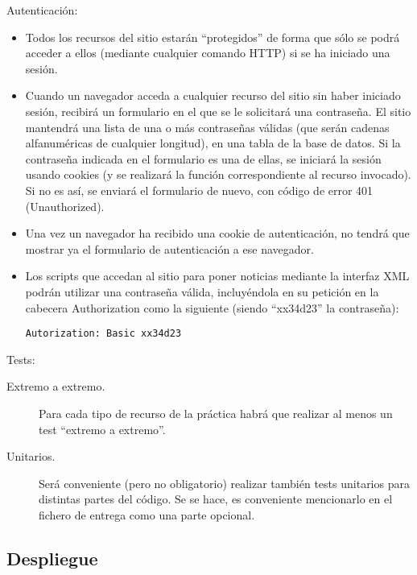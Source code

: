 Autenticación:

\begin{itemize}
\item Todos los recursos del sitio estarán ``protegidos'' de forma que sólo se podrá acceder a ellos (mediante cualquier comando HTTP) si se ha iniciado una sesión.
  
\item Cuando un navegador acceda a cualquier recurso del sitio sin haber iniciado sesión, recibirá un formulario en el que se le solicitará una contraseña. El sitio mantendrá una lista de una o más contraseñas válidas (que serán cadenas alfanuméricas de cualquier longitud), en una tabla de la base de datos. Si la contraseña indicada en el formulario es una de ellas, se iniciará la sesión usando cookies (y se realizará la función correspondiente al recurso invocado). Si no es así, se enviará el formulario de nuevo, con código de error 401 (Unauthorized).

\item Una vez un navegador ha recibido una cookie de autenticación, no tendrá que mostrar ya el formulario de autenticación a ese navegador.
  
\item Los scripts que accedan al sitio para poner noticias mediante la interfaz XML podrán utilizar una contraseña válida, incluyéndola en su petición en la cabecera Authorization como la siguiente (siendo ``xx34d23'' la contraseña):

\begin{verbatim}
Autorization: Basic xx34d23
\end{verbatim}

\end{itemize}

Tests:

\begin{description}
\item[Extremo a extremo.] Para cada tipo de recurso de la práctica habrá que realizar al menos un test ``extremo a extremo''.
\item[Unitarios.] Será conveniente (pero no obligatorio) realizar también tests unitarios para distintas partes del código. Se se hace, es conveniente mencionarlo en el fichero de entrega como una parte opcional.
\end{description}

\subsection{Despliegue}
\label{sec:practica-2023-05:despliegue}

